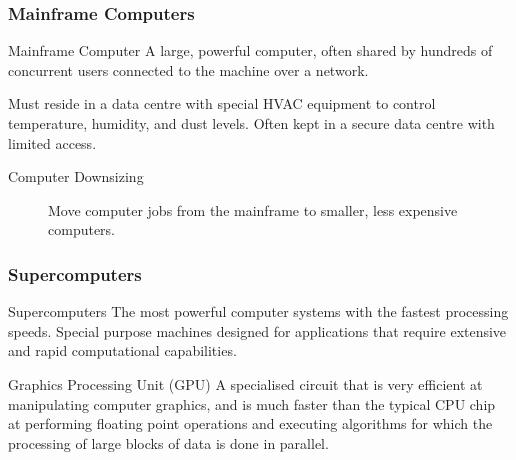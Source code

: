 \documentclass[\main/notes.tex]{subfiles}
\begin{document}
				\subsubsection{Mainframe Computers}
					\begin{definition}{Mainframe Computer}
						A large, powerful computer, often shared by hundreds of concurrent users connected to the machine over a network.

						Must reside in a data centre with special HVAC equipment to control temperature, humidity, and dust levels. Often kept in a secure data centre with limited access.

						\begin{description}
							\item[Computer Downsizing] Move computer jobs from the mainframe to smaller, less expensive computers.
						\end{description}
					\end{definition}
				\subsubsection{Supercomputers}
					\begin{definition}{Supercomputers}
						The most powerful computer systems with the fastest processing speeds. Special purpose machines designed for applications that require extensive and rapid computational capabilities.
					\end{definition}
					\begin{definition}{Graphics Processing Unit (GPU)}
						A specialised circuit that is very efficient at manipulating computer graphics, and is much faster than the typical CPU chip at performing floating point operations and executing algorithms for which the processing of large blocks of data is done in parallel.
					\end{definition}
	\vbox{}
\end{document}
